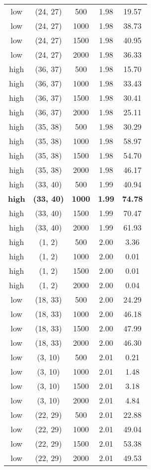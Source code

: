 \begin{tabular}{c c c c c}
low & (24, 27) &  500 & 1.98 & 19.57 \\
low & (24, 27) &  1000 & 1.98 & 38.73 \\
low & (24, 27) &  1500 & 1.98 & 40.95 \\
low & (24, 27) &  2000 & 1.98 & 36.33 \\
high & (36, 37) &  500 & 1.98 & 15.70 \\
high & (36, 37) &  1000 & 1.98 & 33.43 \\
high & (36, 37) &  1500 & 1.98 & 30.41 \\
high & (36, 37) &  2000 & 1.98 & 25.11 \\
high & (35, 38) &  500 & 1.98 & 30.29 \\
high & (35, 38) &  1000 & 1.98 & 58.97 \\
high & (35, 38) &  1500 & 1.98 & 54.70 \\
high & (35, 38) &  2000 & 1.98 & 46.17 \\
high & (33, 40) &  500 & 1.99 & 40.94 \\
\textbf{high} & \textbf{(33, 40)} & \textbf{ 1000} & \textbf{1.99} & \textbf{74.78} \\
high & (33, 40) &  1500 & 1.99 & 70.47 \\
high & (33, 40) &  2000 & 1.99 & 61.93 \\
high & (1, 2) &  500 & 2.00 & 3.36 \\
high & (1, 2) &  1000 & 2.00 & 0.01 \\
high & (1, 2) &  1500 & 2.00 & 0.01 \\
high & (1, 2) &  2000 & 2.00 & 0.04 \\
low & (18, 33) &  500 & 2.00 & 24.29 \\
low & (18, 33) &  1000 & 2.00 & 46.18 \\
low & (18, 33) &  1500 & 2.00 & 47.99 \\
low & (18, 33) &  2000 & 2.00 & 46.30 \\
low & (3, 10) &  500 & 2.01 & 0.21 \\
low & (3, 10) &  1000 & 2.01 & 1.48 \\
low & (3, 10) &  1500 & 2.01 & 3.18 \\
low & (3, 10) &  2000 & 2.01 & 4.84 \\
low & (22, 29) &  500 & 2.01 & 22.88 \\
low & (22, 29) &  1000 & 2.01 & 49.04 \\
low & (22, 29) &  1500 & 2.01 & 53.38 \\
low & (22, 29) &  2000 & 2.01 & 49.53 \\

\end{tabular}
